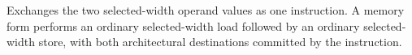 Exchanges the two selected-width operand values as one instruction. A memory form performs an ordinary selected-width load followed by an ordinary selected-width store, with both architectural destinations committed by the instruction.
